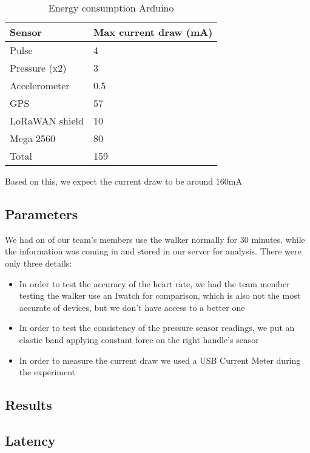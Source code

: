 			\begin{table}[h]
				\begin{tabular}{@{}ll@{}}
					\toprule
					Sensor         & Max current draw (mA) \\ \midrule
					Pulse          & 4                     \\
					Pressure (x2)  & 3                     \\
					Accelerometer  & 0.5                   \\
					GPS            & 57                    \\
					LoRaWAN shield & 10                    \\
					Mega 2560      & 80                    \\
					Total          & 159                   \\ \bottomrule
				\end{tabular}
				\caption[Energy consumption Arduino]{Energy consumption Arduino}
				\label{tab:EnergyConsumption}
			\end{table}

			Based on this, we expect the current draw to be around 160mA

	\subsection{Parameters}
		We had on of our team's members use the walker normally for 30 minutes, while the information was coming in and stored in our server for analysis. There were only three details:

		\begin{itemize}
		  \item In order to test the accuracy of the heart rate, we had the team member testing the walker use an Iwatch for comparison, which is also not the most accurate of devices, but we don't have access to a better one
		  \item In order to test the consistency of the pressure sensor readings, we put an elastic band applying constant force on the right handle's sensor
		  \item In order to measure the current draw we used a USB Current Meter during the experiment
		\end{itemize}

	\subsection{Results}
		\subsection{Latency}

